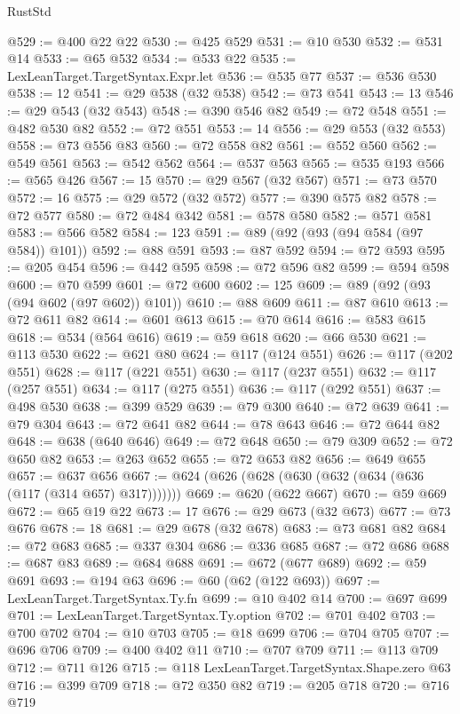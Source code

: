 \begin{lexlean}{RustStd}
\begin{coremodule}
{\begin{coremodule}
{{{{{{{{{{{{{{{{{{{{{{{{{{{{{{{{{{{{{{{{{{{{{{{{{{{{{{{@529 := @400 @22 @22
@530 := @425 @529
@531 := @10 @530
@532 := @531 @14
@533 := @65 @532
@534 := @533 @22
@535 := LexLeanTarget.TargetSyntax.Expr.let
@536 := @535 @77
@537 := @536 @530
@538 := 12
@541 := @29 @538 (@32 @538)
@542 := @73 @541
@543 := 13
@546 := @29 @543 (@32 @543)
@548 := @390 @546 @82
@549 := @72 @548
@551 := @482 @530 @82
@552 := @72 @551
@553 := 14
@556 := @29 @553 (@32 @553)
@558 := @73 @556 @83
@560 := @72 @558 @82
@561 := @552 @560
@562 := @549 @561
@563 := @542 @562
@564 := @537 @563
@565 := @535 @193
@566 := @565 @426
@567 := 15
@570 := @29 @567 (@32 @567)
@571 := @73 @570
@572 := 16
@575 := @29 @572 (@32 @572)
@577 := @390 @575 @82
@578 := @72 @577
@580 := @72 @484 @342
@581 := @578 @580
@582 := @571 @581
@583 := @566 @582
@584 := 123
@591 := @89 (@92 (@93 (@94 @584 (@97 @584)) @101))
@592 := @88 @591
@593 := @87 @592
@594 := @72 @593
@595 := @205 @454
@596 := @442 @595
@598 := @72 @596 @82
@599 := @594 @598
@600 := @70 @599
@601 := @72 @600
@602 := 125
@609 := @89 (@92 (@93 (@94 @602 (@97 @602)) @101))
@610 := @88 @609
@611 := @87 @610
@613 := @72 @611 @82
@614 := @601 @613
@615 := @70 @614
@616 := @583 @615
@618 := @534 (@564 @616)
@619 := @59 @618
@620 := @66 @530
@621 := @113 @530
@622 := @621 @80
@624 := @117 (@124 @551)
@626 := @117 (@202 @551)
@628 := @117 (@221 @551)
@630 := @117 (@237 @551)
@632 := @117 (@257 @551)
@634 := @117 (@275 @551)
@636 := @117 (@292 @551)
@637 := @498 @530
@638 := @399 @529
@639 := @79 @300
@640 := @72 @639
@641 := @79 @304
@643 := @72 @641 @82
@644 := @78 @643
@646 := @72 @644 @82
@648 := @638 (@640 @646)
@649 := @72 @648
@650 := @79 @309
@652 := @72 @650 @82
@653 := @263 @652
@655 := @72 @653 @82
@656 := @649 @655
@657 := @637 @656
@667 := @624 (@626 (@628 (@630 (@632 (@634 (@636 (@117 (@314 @657) @317)))))))
@669 := @620 (@622 @667)
@670 := @59 @669
@672 := @65 @19 @22
@673 := 17
@676 := @29 @673 (@32 @673)
@677 := @73 @676
@678 := 18
@681 := @29 @678 (@32 @678)
@683 := @73 @681 @82
@684 := @72 @683
@685 := @337 @304
@686 := @336 @685
@687 := @72 @686
@688 := @687 @83
@689 := @684 @688
@691 := @672 (@677 @689)
@692 := @59 @691
@693 := @194 @63
@696 := @60 (@62 (@122 @693))
@697 := LexLeanTarget.TargetSyntax.Ty.fn
@699 := @10 @402 @14
@700 := @697 @699
@701 := LexLeanTarget.TargetSyntax.Ty.option
@702 := @701 @402
@703 := @700 @702
@704 := @10 @703
@705 := @18 @699
@706 := @704 @705
@707 := @696 @706
@709 := @400 @402 @11
@710 := @707 @709
@711 := @113 @709
@712 := @711 @126
@715 := @118 LexLeanTarget.TargetSyntax.Shape.zero @63
@716 := @399 @709
@718 := @72 @350 @82
@719 := @205 @718
@720 := @716 @719
}}}}}}}}}}}}}}}}}}}}}}}}}}}}}}}}}}}}}}}}}}}}}}}}}}}}}}}
\end{coremodule}}
\end{coremodule}
\end{lexlean}
